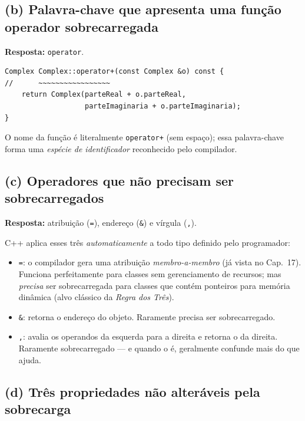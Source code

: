\documentclass[11pt,a4paper]{article}
\begin{document}
\subsection*{(b) Palavra-chave que apresenta uma fun\c{c}\~ao operador sobrecarregada}

\begin{resposta}\textbf{Resposta:} \texttt{operator}.\end{resposta}

\begin{lstlisting}[style=cppcode,numbers=none]
Complex Complex::operator+(const Complex &o) const {
//      ~~~~~~~~~~~~~~~~~
    return Complex(parteReal + o.parteReal,
                   parteImaginaria + o.parteImaginaria);
}
\end{lstlisting}

O nome da fun\c{c}\~ao \'e literalmente \texttt{operator+} (sem espa\c{c}o); essa palavra-chave forma uma \emph{esp\'ecie de identificador} reconhecido pelo compilador.

\subsection*{(c) Operadores que n\~ao precisam ser sobrecarregados}

\begin{resposta}\textbf{Resposta:} atribui\c{c}\~ao (\texttt{=}), endere\c{c}o (\texttt{\&}) e v\'irgula (\texttt{,}).\end{resposta}

C++ aplica esses tr\^es \emph{automaticamente} a todo tipo definido pelo programador:

\begin{itemize}[leftmargin=*,itemsep=0pt]
  \item \texttt{=}: o compilador gera uma atribui\c{c}\~ao \emph{membro-a-membro} (j\'a vista no Cap.~17). Funciona perfeitamente para classes sem gerenciamento de recursos; mas \emph{precisa} ser sobrecarregada para classes que cont\'em ponteiros para mem\'oria din\^amica (alvo cl\'assico da \emph{Regra dos Tr\^es}).
  \item \texttt{\&}: retorna o endere\c{c}o do objeto. Raramente precisa ser sobrecarregado.
  \item \texttt{,}: avalia os operandos da esquerda para a direita e retorna o da direita. Raramente sobrecarregado --- e quando o \'e, geralmente confunde mais do que ajuda.
\end{itemize}

\subsection*{(d) Tr\^es propriedades n\~ao alter\'aveis pela sobrecarga}
\end{document}
